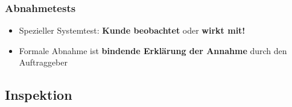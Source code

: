 \documentclass[parskip=full, 12pt]{scrartcl}
\begin{document}
			\subsubsection{Abnahmetests}
			
				\begin{itemize}
					\item Spezieller Systemtest: \textbf{Kunde beobachtet} oder \textbf{wirkt mit!}
					\item Formale Abnahme ist \textbf{bindende Erklärung der Annahme} durch den Auftraggeber
				\end{itemize}
	
		\subsection{Inspektion}
		
\end{document}

